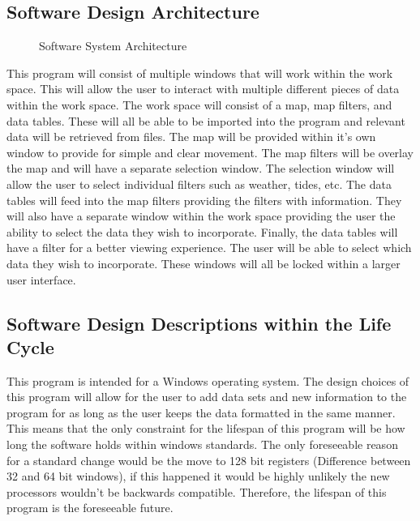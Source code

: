 \documentclass[onecolumn, draftclsnofoot,10pt, compsoc]{IEEEtran}
\begin{document}
\begin{singlespace}
    \subsection{Software Design Architecture}
    \begin{figure}[H]
    \caption{Software System Architecture}
    \label{fig:SoftwareDesign}
    \end{figure}
        This program will consist of multiple windows that will work within the work space. This will allow the user to interact with multiple different pieces of data within the work space. The work space will consist of a map, map filters, and data tables. These will all be able to be imported into the program and relevant data will be retrieved from files. The map will be provided within it's own window to provide for simple and clear movement. The map filters will be overlay the map and will have a separate selection window. The selection window will allow the user to select individual filters such as weather, tides, etc. The data tables will feed into the map filters providing the filters with information. They will also have a separate window within the work space providing the user the ability to select the data they wish to incorporate. Finally, the data tables will have a filter for a better viewing experience. The user will be able to select which data they wish to incorporate. These windows will all be locked within a larger user interface. 
\pagebreak
    \subsection{Software Design Descriptions within the Life Cycle}
    This program is intended for a Windows operating system. The design choices of this program will allow for the user to add data sets and new information to the program for as long as the user keeps the data formatted in the same manner. This means that the only constraint for the lifespan of this program will be how long the software holds within windows standards. The only foreseeable reason for a standard change would be the move to 128 bit registers (Difference between 32 and 64 bit windows), if this happened it would be highly unlikely the new processors wouldn't be backwards compatible. Therefore, the lifespan of this program is the foreseeable future.
 \pagebreak  

\end{singlespace}
\end{document}
